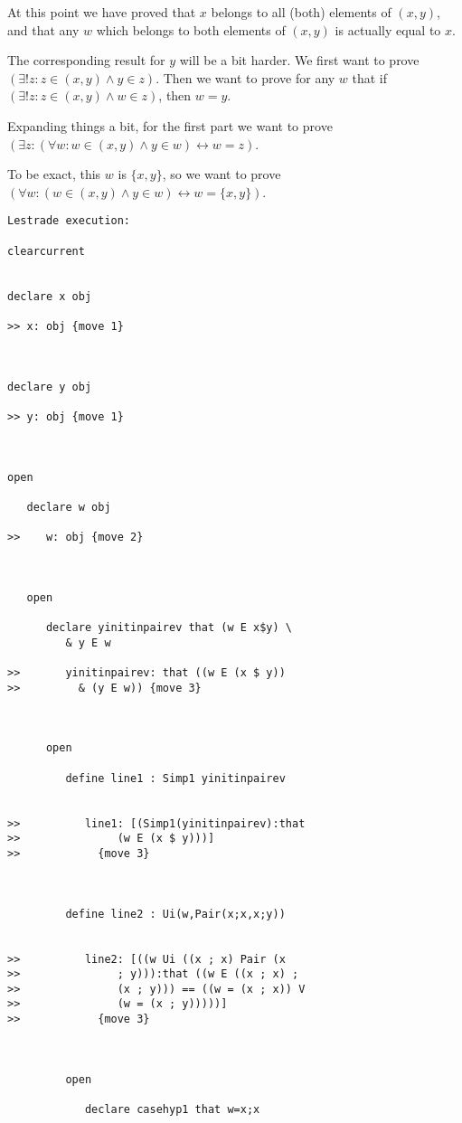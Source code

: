\documentclass[12pt]{article}
\begin{document}
At this point we have proved that $x$ belongs to all (both) elements of $(x,y)$, and that any $w$ which belongs to both elements of $(x,y)$ is actually equal to $x$.

The corresponding result for $y$ will be a bit harder.  We first want to prove $(\exists! z: z \in (x,y) \wedge y \in z)$.
Then we want to prove for any $w$ that if $(\exists! z: z \in (x,y) \wedge w \in z)$, then $w=y$.

Expanding things a bit, for the first part we want to prove $(\exists z:(\forall w: w \in (x,y) \wedge y \in w) \leftrightarrow w=z)$.

To be exact, this $w$ is $\{x,y\}$, so we want to prove $(\forall w: (w \in (x,y) \wedge y \in w) \leftrightarrow w = \{x,y\})$.

\begin{verbatim}Lestrade execution:

clearcurrent


declare x obj

>> x: obj {move 1}



declare y obj

>> y: obj {move 1}



open

   declare w obj

>>    w: obj {move 2}



   open

      declare yinitinpairev that (w E x$y) \
         & y E w

>>       yinitinpairev: that ((w E (x $ y))
>>         & (y E w)) {move 3}



      open

         define line1 : Simp1 yinitinpairev


>>          line1: [(Simp1(yinitinpairev):that
>>               (w E (x $ y)))]
>>            {move 3}



         define line2 : Ui(w,Pair(x;x,x;y))


>>          line2: [((w Ui ((x ; x) Pair (x
>>               ; y))):that ((w E ((x ; x) ;
>>               (x ; y))) == ((w = (x ; x)) V
>>               (w = (x ; y)))))]
>>            {move 3}



         open

            declare casehyp1 that w=x;x


\end{verbatim}
\end{document}
